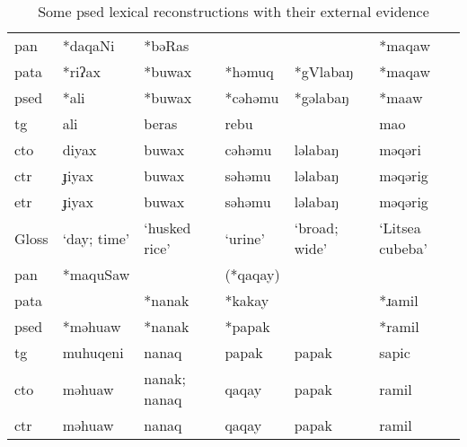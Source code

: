 \begingroup
{}
\renewcommand\arraystretch{1.5}
\begin{table}[!htbp]
\centering
\caption{Some \acl{psed} lexical reconstructions with their external evidence}
\label{tab:lex_recon}
\begin{tabular}{l>{\raggedright\arraybackslash}p{2cm}>{\raggedright\arraybackslash}p{2cm}>{\raggedright\arraybackslash}p{2cm}>{\raggedright\arraybackslash}p{2cm}>{\raggedright\arraybackslash}p{2cm}}
\hline
\acs{pan}  & *daqaNi       & *bəRas              &                &                 & *maqaw                  \\
\acs{pata} & *riʔax        & *buwax              & *həmuq         & *gVlabaŋ        & *maqaw                  \\ 
\acs{psed} & *ali          & *buwax              & *cəhəmu        & *gəlabaŋ        & *maaw                   \\ \hdashline
\acs{tg}   & ali           & beras               & rebu           &                 & mao                     \\
\acs{cto}  & diyax         & buwax               & cəhəmu         & ləlabaŋ         & məqəri                  \\
\acs{ctr}  & ɟiyax         & buwax               & səhəmu         & ləlabaŋ         & məqərig                 \\
\acs{etr}  & ɟiyax         & buwax               & səhəmu         & ləlabaŋ         & məqərig                 \\
Gloss      & `day; time'   & `husked rice'       & `urine'        & `broad; wide'   & `Litsea cubeba' \\ \hline\hline
\acs{pan}  & *maquSaw      &                     & (*qaqay)       &                 &                         \\
\acs{pata} &               & *nanak              & *kakay         &                 & *ɹamil                  \\ 
\acs{psed} & *məhuaw       & *nanak              & *papak         &                 & *ramil                  \\ \hdashline
\acs{tg}   & muhuqeni      & nanaq               & papak          & papak           & sapic                   \\
\acs{cto}  & məhuaw        & nanak; nanaq        & qaqay          & papak           & ramil                   \\
\acs{ctr}  & məhuaw        & nanaq               & qaqay          & papak           & ramil                   \\

\end{tabular}
\end{table}
